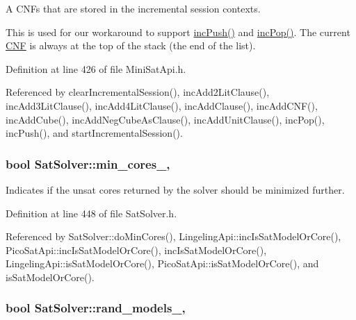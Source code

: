 A C\-N\-Fs that are stored in the incremental session contexts. 

This is used for our workaround to support \hyperlink{classMiniSatApi_a27013ace25320f68252bef5ba9f2e9ad}{inc\-Push()} and \hyperlink{classMiniSatApi_af388f97db15f77baeb420a8fef74ca6a}{inc\-Pop()}. The current \hyperlink{classCNF}{C\-N\-F} is always at the top of the stack (the end of the list). 

Definition at line 426 of file Mini\-Sat\-Api.\-h.



Referenced by clear\-Incremental\-Session(), inc\-Add2\-Lit\-Clause(), inc\-Add3\-Lit\-Clause(), inc\-Add4\-Lit\-Clause(), inc\-Add\-Clause(), inc\-Add\-C\-N\-F(), inc\-Add\-Cube(), inc\-Add\-Neg\-Cube\-As\-Clause(), inc\-Add\-Unit\-Clause(), inc\-Pop(), inc\-Push(), and start\-Incremental\-Session().

\hypertarget{classSatSolver_adfeecebfd09606c82b5c57cfe5aad813}{
\subsubsection[{min\-\_\-cores\-\_\-}]{\setlength{\rightskip}{0pt plus 5cm}bool Sat\-Solver\-::min\-\_\-cores\-\_\-\hspace{0.3cm}{\ttfamily [protected]}, {\ttfamily [inherited]}}}\label{classSatSolver_adfeecebfd09606c82b5c57cfe5aad813}


Indicates if the unsat cores returned by the solver should be minimized further. 



Definition at line 448 of file Sat\-Solver.\-h.



Referenced by Sat\-Solver\-::do\-Min\-Cores(), Lingeling\-Api\-::inc\-Is\-Sat\-Model\-Or\-Core(), Pico\-Sat\-Api\-::inc\-Is\-Sat\-Model\-Or\-Core(), inc\-Is\-Sat\-Model\-Or\-Core(), Lingeling\-Api\-::is\-Sat\-Model\-Or\-Core(), Pico\-Sat\-Api\-::is\-Sat\-Model\-Or\-Core(), and is\-Sat\-Model\-Or\-Core().

\hypertarget{classSatSolver_a73fed24d8fb4da85ef82dc53ac5f28c7}{
\subsubsection[{rand\-\_\-models\-\_\-}]{\setlength{\rightskip}{0pt plus 5cm}bool Sat\-Solver\-::rand\-\_\-models\-\_\-\hspace{0.3cm}{\ttfamily [protected]}, {\ttfamily [inherited]}}}\label{classSatSolver_a73fed24d8fb4da85ef82dc53ac5f28c7}


